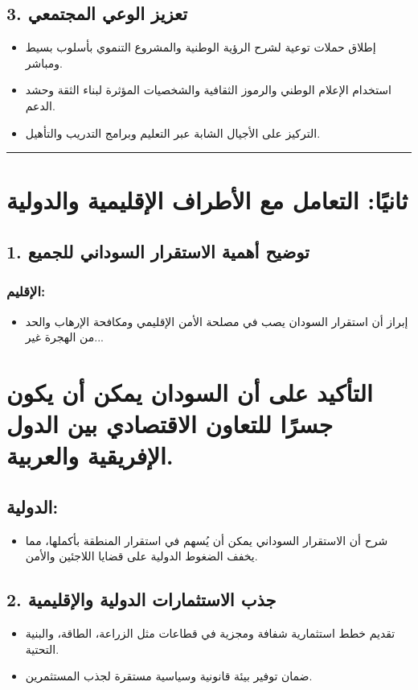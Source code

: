 \documentclass[12pt]{article}
\begin{document}
\subsection{3. تعزيز الوعي المجتمعي}
\begin{itemize}
    \item إطلاق حملات توعية لشرح الرؤية الوطنية والمشروع التنموي بأسلوب بسيط ومباشر.
    \item استخدام الإعلام الوطني والرموز الثقافية والشخصيات المؤثرة لبناء الثقة وحشد الدعم.
    \item التركيز على الأجيال الشابة عبر التعليم وبرامج التدريب والتأهيل.
\end{itemize}

\hrule

\section{ثانيًا: التعامل مع الأطراف الإقليمية والدولية}
\subsection{1. توضيح أهمية الاستقرار السوداني للجميع}
\subsubsection{الإقليم:}
\begin{itemize}
    \item إبراز أن استقرار السودان يصب في مصلحة الأمن الإقليمي ومكافحة الإرهاب والحد من الهجرة غير...
\end{itemize}



\section{التأكيد على أن السودان يمكن أن يكون جسرًا للتعاون الاقتصادي بين الدول الإفريقية والعربية.}
\subsection{الدولية:}
\begin{itemize}
    \item شرح أن الاستقرار السوداني يمكن أن يُسهم في استقرار المنطقة بأكملها، مما يخفف الضغوط الدولية على قضايا اللاجئين والأمن.
\end{itemize}

\subsection{2. جذب الاستثمارات الدولية والإقليمية}
\begin{itemize}
    \item تقديم خطط استثمارية شفافة ومجزية في قطاعات مثل الزراعة، الطاقة، والبنية التحتية.
    \item ضمان توفير بيئة قانونية وسياسية مستقرة لجذب المستثمرين.
\end{itemize}
\end{document}
